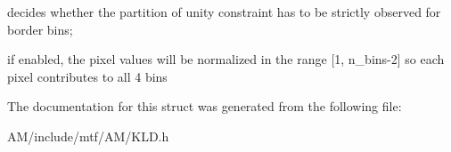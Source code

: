 decides whether the partition of unity constraint has to be strictly observed for border bins; 

if enabled, the pixel values will be normalized in the range \mbox{[}1, n\-\_\-bins-\/2\mbox{]} so each pixel contributes to all 4 bins 

The documentation for this struct was generated from the following file\-:\begin{DoxyCompactItemize}
\item 
A\-M/include/mtf/\-A\-M/K\-L\-D.\-h\end{DoxyCompactItemize}
